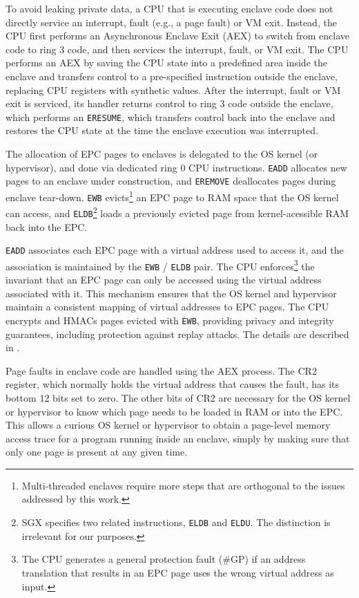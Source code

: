 To avoid leaking private data, a CPU that is executing enclave code does not
directly service an interrupt, fault (e.g., a page fault) or VM exit. Instead,
the CPU first performs an Asynchronous Enclave Exit (AEX) to switch from
enclave code to ring 3 code, and then services the interrupt, fault, or VM
exit.  The CPU performs an AEX by saving the CPU state into a predefined area
inside the enclave and transfers control to a pre-specified instruction outside
the enclave, replacing CPU registers with synthetic values. After the
interrupt, fault or VM exit is serviced, its handler returns control to ring 3
code outside the enclave, which performs an \texttt{ERESUME}, which transfers
control back into the enclave and restores the CPU state at the time the
enclave execution was interrupted.

The allocation of EPC pages to enclaves is delegated to the OS kernel (or
hypervisor), and done via dedicated ring 0 CPU instructions. \texttt{EADD}
allocates new pages to an enclave under construction, and \texttt{EREMOVE}
deallocates pages during enclave tear-down. \texttt{EWB} evicts\footnote{
Multi-threaded enclaves require more steps that are orthogonal to the issues
addressed by this work.} an EPC page to RAM space that the OS kernel can
access, and \texttt{ELDB}\footnote{SGX specifies two related instructions,
\texttt{ELDB} and \texttt{ELDU}. The distinction is irrelevant for our
purposes.} loads a previously evicted page from kernel-acessible RAM back into
the EPC.

\texttt{EADD} associates each EPC page with a virtual address used to access
it, and the association is maintained by the \texttt{EWB} / \texttt{ELDB} pair.
The CPU enforces\footnote{The CPU generates a general protection fault (\#GP)
if an address translation that results in an EPC page uses the wrong virtual
address as input.} the invariant that an EPC page can only be accessed using
the virtual address associated with it. This mechanism ensures that the OS
kernel and hypervisor maintain a consistent mapping of virtual addresses to
EPC pages. The CPU encrypts and HMACs pages evicted with \texttt{EWB},
providing privacy and integrity guarantees, including protection against replay
attacks. The details are described in \cite{intel2013sgxmanual}.

Page faults in enclave code are handled using the AEX process. The CR2
register, which normally holds the virtual address that causes the fault, has
its bottom 12 bits set to zero. The other bits of CR2 are necessary for the OS
kernel or hypervisor to know which page needs to be loaded in RAM or into the
EPC. This allows a curious OS kernel or hypervisor to obtain a page-level
memory access trace for a program running inside an enclave, simply by making
sure that only one page is present at any given time.


